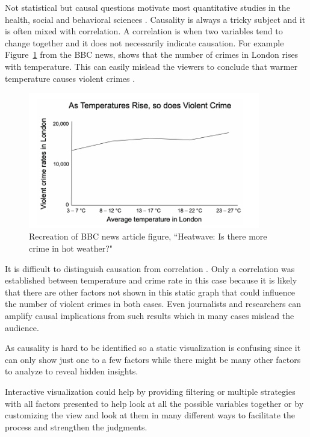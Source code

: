 Not statistical but causal questions motivate most quantitative studies in the health, social and behavioral sciences \cite{pearl2011science}. Causality is always a tricky subject and it is often mixed with correlation. A correlation is when two variables tend to change together and it does not necessarily indicate causation. For example Figure~\ref{fig:temp} from the BBC news, shows that the number of crimes in London rises with temperature. This can easily mislead the viewers to conclude that warmer temperature causes violent crimes \cite{matute2015illusions}.

\begin{figure}[H]
\centering
\captionsetup{justification=centering}
\includegraphics[width=0.9\textwidth]{./pics/casual1.png}
\caption{Recreation of BBC news article figure, ``Heatwave: Is there more crime in hot weather?"\cite{matute2015illusions} }
\label{fig:temp}
\end{figure}


It is difficult to distinguish causation from correlation \cite{rothman2012epidemiology}. Only a correlation was established between temperature and crime rate in this case because it is likely that there are other factors not shown in this static graph that could influence the number of violent crimes in both cases. Even journalists and researchers can amplify causal implications from such results which in many cases mislead the audience. 

As causality is hard to be identified so a static visualization is confusing since it can only show just one to a few factors while there might be many other factors to analyze to reveal hidden insights. 

Interactive visualization could help by providing filtering or multiple strategies with all factors presented to help look at all the possible variables together or by customizing the view and look at them in many different ways to facilitate the process and strengthen the judgments. 

